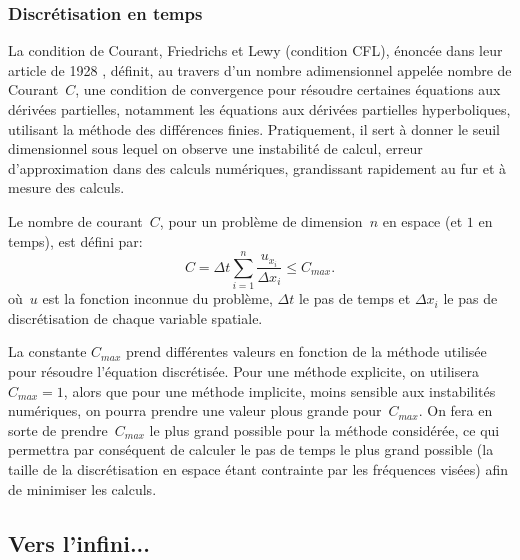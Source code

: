 {\medskip
\subsubsection{Discrétisation en temps}

La condition de Courant, Friedrichs et Lewy (condition CFL), énoncée dans leur article de 1928 \cite{bib-CFL}, définit, au travers d'un nombre adimensionnel appelée nombre de Courant~$C$, une condition de convergence pour résoudre certaines équations aux dérivées partielles, notamment les équations aux dérivées partielles hyperboliques, utilisant la méthode des différences finies. Pratiquement, il sert à donner le seuil dimensionnel sous lequel on observe une instabilité de calcul, erreur d'approximation dans des calculs numériques, grandissant rapidement au fur et à mesure des calculs. 

\medskip
Le nombre de courant~$C$, pour un problème de dimension~$n$ en espace (et $1$ en temps), est défini par:
\begin{equation}
C = \Delta t \sum_{i=1}^n\frac{u_{x_i}}{\Delta x_i} \leq C_{max}. 
\end{equation}
où~$u$ est la fonction inconnue du problème, $\Delta t$ le pas de temps et $\Delta x_i$ le pas de discrétisation de chaque variable spatiale.

La constante $C_{max}$ prend différentes valeurs en fonction de la méthode utilisée pour résoudre l'équation discrétisée.
Pour une méthode explicite, on utilisera $C_{max} = 1$, alors que pour une méthode implicite, moins sensible aux instabilités numériques, on pourra prendre une valeur plous grande pour~$C_{max}$.
On fera en sorte de prendre~$C_{max}$ le plus grand possible pour la méthode considérée, ce qui permettra par conséquent de calculer le pas de temps le plus grand possible (la taille de la discrétisation en espace étant contrainte par les fréquences visées) afin de minimiser les calculs.


\medskip
\subsection{Vers l'infini...}

}
